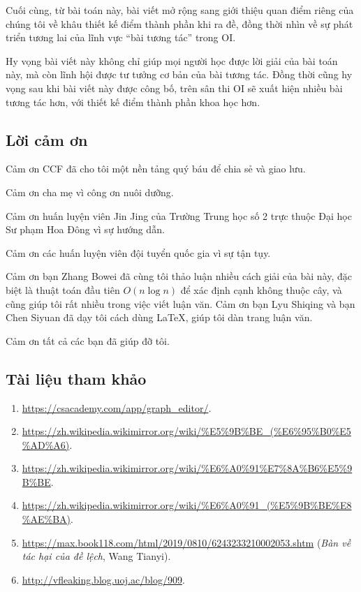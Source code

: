 \documentclass[11pt]{article}
\begin{document}
Cuối cùng, từ bài toán này, bài viết mở rộng sang giới thiệu quan điểm riêng
của chúng tôi về khâu thiết kế điểm thành phần khi ra đề, đồng thời nhìn về sự
phát triển tương lai của lĩnh vực ``bài tương tác'' trong OI.

Hy vọng bài viết này không chỉ giúp mọi người học được lời giải của bài toán
này, mà còn lĩnh hội được tư tưởng cơ bản của bài tương tác. Đồng thời cũng hy
vọng sau khi bài viết này được công bố, trên sân thi OI sẽ xuất hiện nhiều bài
tương tác hơn, với thiết kế điểm thành phần khoa học hơn.

\subsection{Lời cảm ơn}

Cảm ơn CCF đã cho tôi một nền tảng quý báu để chia sẻ và giao lưu.

Cảm ơn cha mẹ vì công ơn nuôi dưỡng.

Cảm ơn huấn luyện viên Jin Jing của Trường Trung học số 2 trực thuộc Đại học Sư
phạm Hoa Đông vì sự hướng dẫn.

Cảm ơn các huấn luyện viên đội tuyển quốc gia vì sự tận tụy.

Cảm ơn bạn Zhang Bowei đã cùng tôi thảo luận nhiều cách giải của bài này, đặc
biệt là thuật toán đầu tiên \(O(n\log n)\) để xác định cạnh không thuộc cây, và
cũng giúp tôi rất nhiều trong việc viết luận văn. Cảm ơn bạn Lyu Shiqing và bạn
Chen Siyuan đã dạy tôi cách dùng LaTeX, giúp tôi dàn trang luận văn.

Cảm ơn tất cả các bạn đã giúp đỡ tôi.

\subsection*{Tài liệu tham khảo}

\begin{enumerate}
  \item \url{https://csacademy.com/app/graph_editor/}.
  \item \url{https://zh.wikipedia.wikimirror.org/wiki/%E5%9B%BE_(%E6%95%B0%E5%AD%A6)}.
  \item \url{https://zh.wikipedia.wikimirror.org/wiki/%E6%A0%91%E7%8A%B6%E5%9B%BE}.
  \item \url{https://zh.wikipedia.wikimirror.org/wiki/%E6%A0%91_(%E5%9B%BE%E8%AE%BA)}.
  \item \url{https://max.book118.com/html/2019/0810/6243233210002053.shtm}
  (\emph{Bàn về tác hại của đề lệch}, Wang Tianyi).
  \item \url{http://vfleaking.blog.uoj.ac/blog/909}.
\end{enumerate}
\end{document}
